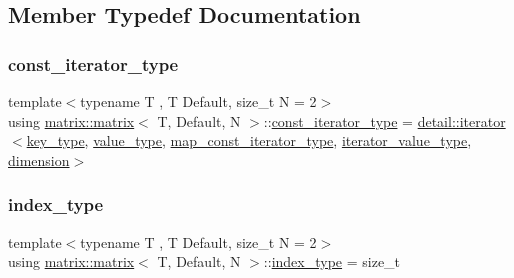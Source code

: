 \subsection{Member Typedef Documentation}
\mbox{\label{structmatrix_1_1matrix_a22035dd29cc89014fbb33fd37bfeac93}} 
\subsubsection{\texorpdfstring{const\+\_\+iterator\+\_\+type}{const\_iterator\_type}}
{\footnotesize\ttfamily template$<$typename T , T Default, size\+\_\+t N = 2$>$ \\
using \hyperlink{structmatrix_1_1matrix}{matrix\+::matrix}$<$ T, Default, N $>$\+::\hyperlink{structmatrix_1_1matrix_a22035dd29cc89014fbb33fd37bfeac93}{const\+\_\+iterator\+\_\+type} =  \hyperlink{structmatrix_1_1detail_1_1iterator}{detail\+::iterator}$<$\hyperlink{structmatrix_1_1matrix_af7b5498ac1b615cb9ef51bd185a2557e}{key\+\_\+type}, \hyperlink{structmatrix_1_1matrix_ab940e7a84942339cdee7c0f0d3bd8ef9}{value\+\_\+type}, \hyperlink{structmatrix_1_1matrix_a8d4e1501743e5c63f4dff2e0ae27cf89}{map\+\_\+const\+\_\+iterator\+\_\+type}, \hyperlink{structmatrix_1_1matrix_a1de5c69f5d9e3b6d3e54b1e4cb433d65}{iterator\+\_\+value\+\_\+type}, \hyperlink{structmatrix_1_1matrix_a7d76bd51fd998974f59ea4035e053f74}{dimension}$>$}

\mbox{\label{structmatrix_1_1matrix_a87b61e7f35dcd5991cd3f243cfeced06}} 
\subsubsection{\texorpdfstring{index\+\_\+type}{index\_type}}
{\footnotesize\ttfamily template$<$typename T , T Default, size\+\_\+t N = 2$>$ \\
using \hyperlink{structmatrix_1_1matrix}{matrix\+::matrix}$<$ T, Default, N $>$\+::\hyperlink{structmatrix_1_1matrix_a87b61e7f35dcd5991cd3f243cfeced06}{index\+\_\+type} =  size\+\_\+t}

\mbox{\label{structmatrix_1_1matrix_a82eef2feb50cdf62ced121fb74d3bc67}} 
